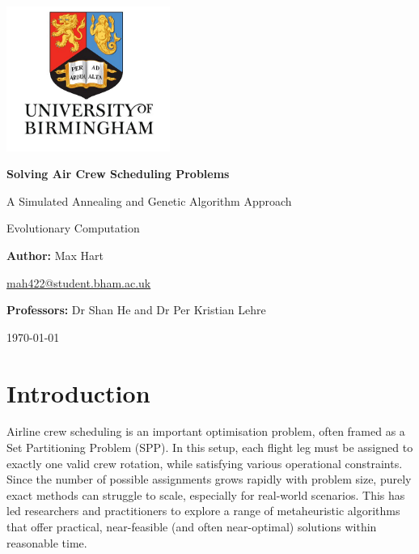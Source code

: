 \documentclass[12pt]{article}
\begin{document}
\begin{titlepage}
    \centering
    \vspace*{1cm}
    
    \includegraphics[width=0.4\textwidth]{UoB.jpg}\par\vspace{1cm}
    
    {\LARGE\bfseries Solving Air Crew Scheduling Problems\par}
    \vspace{0.5cm}
    {\Large A Simulated Annealing and Genetic Algorithm Approach\par}
    \vspace{0.75cm}
    
    {\large Evolutionary Computation\par}
    \vspace{1.5cm}
    
    {\large\textbf{Author:} Max Hart\par}
    \vspace{0.3cm}
    {\normalsize \href{mailto:mah422@student.bham.ac.uk}{mah422@student.bham.ac.uk}\par}
    \vspace{1.5cm}
    
    {\large\textbf{Professors:} Dr Shan He and Dr Per Kristian Lehre\par}
    \vspace{1cm}
    
    {\large \today\par}
    
\end{titlepage}

\tableofcontents

\newpage

\section{Introduction}
Airline crew scheduling is an important optimisation problem, often framed as a Set Partitioning Problem (SPP). In this setup, each flight leg must be assigned to exactly one valid crew rotation, while satisfying various operational constraints. Since the number of possible assignments grows rapidly with problem size, purely exact methods can struggle to scale, especially for real-world scenarios. This has led researchers and practitioners to explore a range of metaheuristic algorithms that offer practical, near-feasible (and often near-optimal) solutions within reasonable time.
\end{document}
